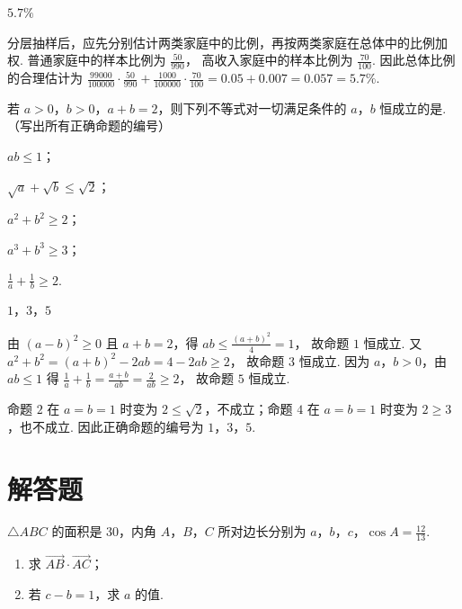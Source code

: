\begin{answer}
\(5.7\%\)
\end{answer}

\begin{solution}
分层抽样后，应先分别估计两类家庭中的比例，再按两类家庭在总体中的比例加权. 普通家庭中的样本比例为
\(\frac{50}{990}\)，
高收入家庭中的样本比例为
\(\frac{70}{100}\).
因此总体比例的合理估计为
\(\frac{99000}{100000}\cdot\frac{50}{990}+\frac{1000}{100000}\cdot\frac{70}{100}=0.05+0.007=0.057=5.7\%\).
\end{solution}

\begin{problem}
若 \(a > 0\)，\(b > 0\)，\(a + b = 2\)，则下列不等式对一切满足条件的 \(a\)，\(b\) 恒成立的是\fillinblank{}.（写出所有正确命题的编号）

\begin{circlelist}
\item \(ab \leqslant 1\)；
\item \(\sqrt{a} + \sqrt{b} \leqslant \sqrt{2}\)；
\item \(a^2 + b^2 \geqslant 2\)；
\item \(a^3 + b^3 \geqslant 3\)；
\item \(\frac{1}{a} + \frac{1}{b} \geqslant 2\).
\end{circlelist}
\end{problem}

\begin{answer}
\(1\)，\(3\)，\(5\)
\end{answer}

\begin{solution}
由 \((a-b)^2\geqslant0\) 且 \(a+b=2\)，得
\(ab\leqslant\frac{(a+b)^2}{4}=1\)，
故命题 \(1\) 恒成立. 又
\(a^2+b^2=(a+b)^2-2ab=4-2ab\geqslant2\)，
故命题 \(3\) 恒成立. 因为 \(a\)，\(b>0\)，由 \(ab\leqslant1\) 得
\(\frac1a+\frac1b=\frac{a+b}{ab}=\frac2{ab}\geqslant2\)，
故命题 \(5\) 恒成立.

命题 \(2\) 在 \(a=b=1\) 时变为 \(2\leqslant\sqrt2\)，不成立；命题 \(4\) 在 \(a=b=1\) 时变为 \(2\geqslant3\)，也不成立. 因此正确命题的编号为 \(1\)，\(3\)，\(5\).
\end{solution}

\section{解答题}

\begin{problem}
\(\triangle ABC\) 的面积是 30，内角 \(A\)，\(B\)，\(C\) 所对边长分别为 \(a\)，\(b\)，\(c\)，\(\cos A = \frac{12}{13}\).

\begin{enumerate}
\item 求 \( \overrightarrow{AB} \cdot \overrightarrow{AC} \)；
\item 若 \(c - b = 1\)，求 \(a\) 的值.
\end{enumerate}
\end{problem}

